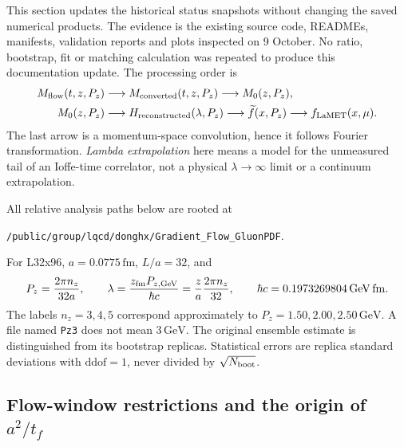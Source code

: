 \documentclass[11pt]{article}
\numberwithin{equation}{section}
\begin{document}
This section updates the historical status snapshots without changing the
saved numerical products. The evidence is the existing source code,
READMEs, manifests, validation reports and plots inspected on 9 October.
No ratio, bootstrap, fit or matching calculation was repeated to produce
this documentation update. The processing order is
\begin{equation}
 \begin{aligned}
 M_{\rm flow}(t,z,P_z)
 &\longrightarrow M_{\rm converted}(t,z,P_z)
 \longrightarrow M_0(z,P_z),\\
 M_0(z,P_z)
 &\longrightarrow H_{\rm reconstructed}(\lambda,P_z)
 \longrightarrow \widetilde f(x,P_z)
 \longrightarrow f_{\rm LaMET}(x,\mu).
 \end{aligned}
 \label{eq:october-chain}
\end{equation}
The last arrow is a momentum-space convolution, hence it follows Fourier
transformation. \emph{Lambda extrapolation} here means a model for the
unmeasured tail of an Ioffe-time correlator, not a physical
\(\lambda\to\infty\) limit or a continuum extrapolation.

All relative analysis paths below are rooted at
\begin{center}
\nolinkurl{/public/group/lqcd/donghx/Gradient_Flow_GluonPDF}.
\end{center}
For L32x96, \(a=0.0775\,\mathrm{fm}\), \(L/a=32\), and
\begin{equation}
 P_z=\frac{2\pi n_z}{32a},\qquad
 \lambda=\frac{z_{\rm fm}P_{z,\rm GeV}}{\hbar c}
         =\frac{z}{a}\frac{2\pi n_z}{32},\qquad
 \hbar c=0.1973269804\,\mathrm{GeV\,fm}.
\end{equation}
The labels \(n_z=3,4,5\) correspond approximately to
\(P_z=1.50,2.00,2.50\,\mathrm{GeV}\). A file named \texttt{Pz3}
does not mean \(3\,\mathrm{GeV}\).
The original ensemble estimate is distinguished from its bootstrap
replicas. Statistical errors are replica standard deviations with
\(\mathrm{ddof}=1\), never divided by \(\sqrt{N_{\rm boot}}\).

\subsection{Flow-window restrictions and the origin of \(a^2/t_f\)}
\label{sec:flow-artifact-derivation}
\end{document}
